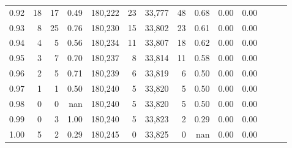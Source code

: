\begin{tabular}{rrrrrrrrrrrrrr}
0.92 &     18 &   17 &  0.49 &  180,222 &       23 &  33,777 &      48 &  0.68 &  0.00 &      0.00 \\
0.93 &      8 &   25 &  0.76 &  180,230 &       15 &  33,802 &      23 &  0.61 &  0.00 &      0.00 \\
0.94 &      4 &    5 &  0.56 &  180,234 &       11 &  33,807 &      18 &  0.62 &  0.00 &      0.00 \\
0.95 &      3 &    7 &  0.70 &  180,237 &        8 &  33,814 &      11 &  0.58 &  0.00 &      0.00 \\
0.96 &      2 &    5 &  0.71 &  180,239 &        6 &  33,819 &       6 &  0.50 &  0.00 &      0.00 \\
0.97 &      1 &    1 &  0.50 &  180,240 &        5 &  33,820 &       5 &  0.50 &  0.00 &      0.00 \\
0.98 &      0 &    0 &   nan &  180,240 &        5 &  33,820 &       5 &  0.50 &  0.00 &      0.00 \\
0.99 &      0 &    3 &  1.00 &  180,240 &        5 &  33,823 &       2 &  0.29 &  0.00 &      0.00 \\
1.00 &      5 &    2 &  0.29 &  180,245 &        0 &  33,825 &       0 &   nan &  0.00 &      0.00 \\
\bottomrule
\end{tabular}
